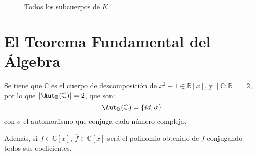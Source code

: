 \begin{ejemplo}
\begin{figure}[H]
        \caption{Todos los subcuerpos de $K$.}
    \end{figure}
\end{ejemplo}

\section{El Teorema Fundamental del Álgebra}
\noindent
Se tiene que $\mathbb{C}$ es el cuerpo de descomposición de $x^2+1\in \mathbb{R}[x]$, y $[\mathbb{C}:\mathbb{R}]=2$, por lo que $|\Aut_\mathbb{R}(\mathbb{C})| = 2$, que son:
\begin{equation*}
    \Aut_\mathbb{R}(\mathbb{C}) = \{id, \sigma\}
\end{equation*}
con $\sigma$ el automorfismo que conjuga cada número complejo.

\noindent
Además, si $f\in \mathbb{C}[x]$, $\overline{f}\in \mathbb{C}[x]$ será el polinomio obtenido de $f$ conjugando todos sus coeficientes.

